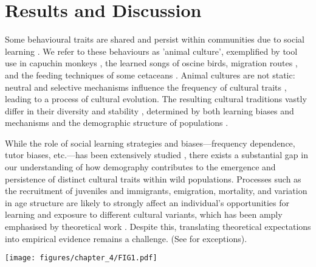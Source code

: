 \section{Results and Discussion}

Some behavioural traits are shared and persist within communities due to social learning \parencite{viciana2021}. We refer to these behaviours as 'animal culture', exemplified by tool use in capuchin monkeys \parencite{falotico2019}, the learned songs of oscine birds, migration routes \parencite{jesmer2018, berdahl2018, byholm2022}, and the feeding techniques of some cetaceans \parencite{allen2013, rendell2001}. Animal cultures are not static: neutral and selective mechanisms influence the frequency of cultural traits \parencite{potvin2015, williams2021}, leading to a process of cultural evolution. The resulting cultural traditions vastly differ in their diversity and stability \parencite{tchernichovski2017}, determined by both learning biases and mechanisms and the demographic structure of populations \parencite{deffner2022a, kandler2017}. 

While the role of social learning strategies and biases---frequency dependence, tutor biases, etc.---has been extensively studied \parencite{pike2010, kendal2015, aplin2017, lachlan2018, tchernichovski2021}, there exists a substantial gap in our understanding of how demography contributes to the emergence and persistence of distinct cultural traits within wild populations. Processes such as the recruitment of juveniles and immigrants, emigration, mortality, and variation in age structure are likely to strongly affect an individual's opportunities for learning and exposure to different cultural variants, which has been amply emphasised by theoretical work \parencite{deffner2022a, deffner2022, kandler2023, fogarty2019, deffner2020, derex2016, kirby2021, nunn2009, barta2023}. Despite this, translating theoretical expectations into empirical evidence remains a challenge. (See \cite{chimento2021, fayet2014} for exceptions). 


\begin{figure*}[hbt!]
    \centering
    \texttt{[image: figures/chapter\_4/FIG1.pdf]}
    \label{c4_fig:main}
\end{figure*}


